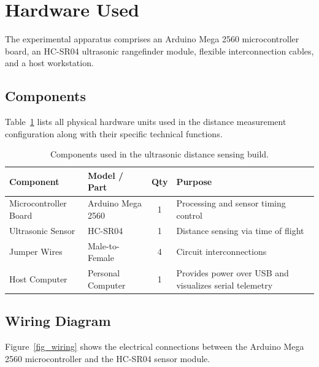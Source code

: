 \documentclass[11pt,a4paper]{article}
\begin{document}
\section{Hardware Used}
The experimental apparatus comprises an Arduino Mega 2560 microcontroller board, an HC-SR04 ultrasonic rangefinder module, flexible interconnection cables, and a host workstation.

\subsection{Components}
Table~\ref{tab_components} lists all physical hardware units used in the distance measurement configuration along with their specific technical functions.

\begin{table}[H]
\centering
\begin{tabularx}{\textwidth}{@{}llcX@{}}
\toprule
\textbf{Component} & \textbf{Model / Part} & \textbf{Qty} & \textbf{Purpose} \\
\midrule
Microcontroller Board & Arduino Mega 2560 & 1 & Processing and sensor timing control \\
Ultrasonic Sensor & HC-SR04 & 1 & Distance sensing via time of flight \\
Jumper Wires & Male-to-Female & 4 & Circuit interconnections \\
Host Computer & Personal Computer & 1 & Provides power over USB and visualizes serial telemetry \\
\bottomrule
\end{tabularx}
\caption{Components used in the ultrasonic distance sensing build.}
\label{tab_components}
\end{table}

\subsection{Wiring Diagram}
Figure~\ref{fig_wiring} shows the electrical connections between the Arduino Mega 2560 microcontroller and the HC-SR04 sensor module.
\end{document}
